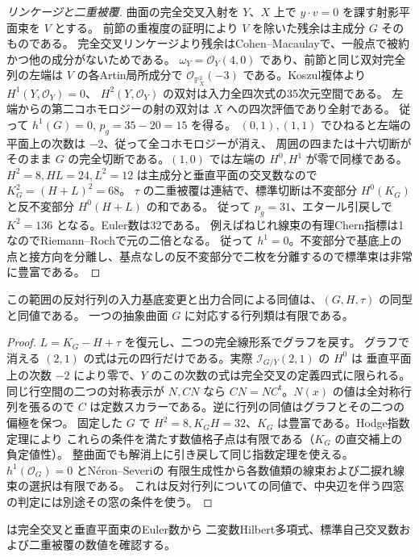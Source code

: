\begin{proof}[リンケージと二重被覆]
曲面の完全交叉入射を $Y$、$X$ 上で $y\cdot v=0$ を課す射影平面束を $V$ とする。
前節の重複度の証明により $V$ を除いた残余は主成分 $G$ そのものである。
完全交叉リンケージより残余はCohen--Macaulayで、一般点で被約かつ他の成分がないためである。
$\omega_Y=\mathcal O_Y(4,0)$ であり、前節と同じ双対完全列の左端は $V$ の各Artin局所成分で
$\mathcal O_{\mathbb P^2_X}(-3)$ である。Koszul複体より $H^1(Y,\mathcal O_Y)=0$、
$H^2(Y,\mathcal O_Y)$ の双対は入力全四次式の35次元空間である。
左端からの第二コホモロジーの射の双対は $X$ への四次評価であり全射である。
従って $h^1(G)=0$, $p_g=35-20=15$ を得る。
$(0,1),(1,1)$ でひねると左端の平面上の次数は $-2$、従って全コホモロジーが消え、
周囲の四または十六切断がそのまま $G$ の完全切断である。$(1,0)$ では左端の $H^0,H^1$ が零で同様である。
$H^2=8,H L=24,L^2=12$ は主成分と垂直平面の交叉数なので $K_G^2=(H+L)^2=68$。
$\tau$ の二重被覆は連結で、標準切断は不変部分 $H^0(K_G)$ と反不変部分 $H^0(H+L)$ の和である。
従って $p_g=31$、エタール引戻しで $K^2=136$ となる。Euler数は32である。
例えばねじれ線束の有理Chern指標は1なのでRiemann--Rochで元の二倍となる。
従って $h^1=0$。不変部分で基底上の点と接方向を分離し、基点なしの反不変部分で二枚を分離するので標準束は非常に豊富である。
\end{proof}

\begin{corollary}\label{cor:octic-canonical-marked-matrix}
この範囲の反対行列の入力基底変更と出力合同による同値は、$(G,H,\tau)$ の同型と同値である。
一つの抽象曲面 $G$ に対応する行列類は有限である。
\end{corollary}
\begin{proof}
$L=K_G-H+\tau$ を復元し、二つの完全線形系でグラフを戻す。
グラフで消える $(2,1)$ の式は元の四行だけである。実際 $\mathcal I_{G/Y}(2,1)$ の $H^0$ は
垂直平面上の次数 $-2$ により零で、$Y$ のこの次数の式は完全交叉の定義四式に限られる。
同じ行空間の二つの対称表示が $N,CN$ なら $CN=NC^{\mathsf t}$。$N(x)$ の値は全対称行列を張るので
$C$ は定数スカラーである。逆に行列の同値はグラフとその二つの偏極を保つ。
固定した $G$ で $H^2=8,K_G H=32$、$K_G$ は豊富である。Hodge指数定理により
これらの条件を満たす数値格子点は有限である（$K_G$ の直交補上の負定値性）。
整曲面でも解消上に引き戻して同じ指数定理を使える。$h^1(\mathcal O_G)=0$ とNéron--Severiの
有限生成性から各数値類の線束および二捩れ線束の選択は有限である。
これは反対行列についての同値で、中央辺を伴う四窓の判定には別途その窓の条件を使う。
\end{proof}

 は完全交叉と垂直平面束のEuler数から
二変数Hilbert多項式、標準自己交叉数および二重被覆の数値を確認する。
